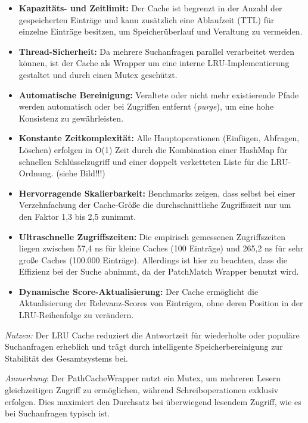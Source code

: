 \begin{itemize}
	\item \textbf{Kapazitäts- und Zeitlimit:} Der Cache ist begrenzt in der Anzahl der gespeicherten Einträge und kann zusätzlich eine Ablaufzeit (TTL) für einzelne Einträge besitzen, um Speicherüberlauf und Veraltung zu vermeiden.
	\item \textbf{Thread-Sicherheit:} Da mehrere Suchanfragen parallel verarbeitet werden können, ist der Cache als Wrapper um eine interne LRU-Implementierung gestaltet und durch einen Mutex geschützt.
	\item \textbf{Automatische Bereinigung:} Veraltete oder nicht mehr existierende Pfade werden automatisch oder bei Zugriffen entfernt (\textit{purge}), um eine hohe Konsistenz zu gewährleisten.
	\item \textbf{Konstante Zeitkomplexität:} Alle Hauptoperationen (Einfügen, Abfragen, Löschen) erfolgen in O(1) Zeit durch die Kombination einer HashMap für schnellen Schlüsselzugriff und einer doppelt verketteten Liste für die LRU-Ordnung. (siehe Bild!!!)
	\item \textbf{Hervorragende Skalierbarkeit:} Benchmarks zeigen, dass selbst bei einer Verzehnfachung der Cache-Größe die durchschnittliche Zugriffszeit nur um den Faktor 1,3 bis 2,5 zunimmt.
	\item \textbf{Ultraschnelle Zugriffszeiten:} Die empirisch gemessenen Zugriffszeiten liegen zwischen 57,4 ns für kleine Caches (100 Einträge) und 265,2 ns für sehr große Caches (100.000 Einträge). Allerdings ist hier zu beachten, dass die Effizienz bei der Suche abnimmt, da der PatchMatch Wrapper benutzt wird.
	\item \textbf{Dynamische Score-Aktualisierung:} Der Cache ermöglicht die Aktualisierung der Relevanz-Scores von Einträgen, ohne deren Position in der LRU-Reihenfolge zu verändern.
\end{itemize}

\textit{Nutzen:} Der LRU Cache reduziert die Antwortzeit für wiederholte oder populäre Suchanfragen erheblich und trägt durch intelligente Speicherbereinigung zur Stabilität des Gesamtsystems bei.

\textit{Anmerkung}: Der PathCacheWrapper nutzt ein Mutex, um mehreren Lesern gleichzeitigen Zugriff zu ermöglichen, während Schreiboperationen exklusiv erfolgen. Dies maximiert den Durchsatz bei überwiegend lesendem Zugriff, wie es bei Suchanfragen typisch ist.

